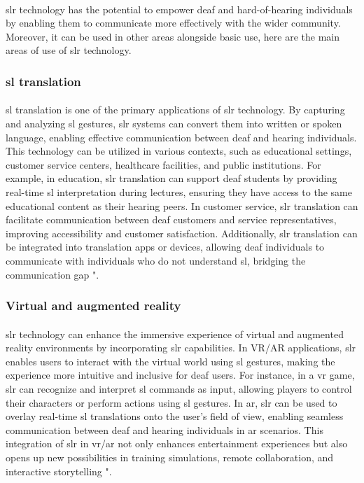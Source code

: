 \paragraph{}
\ac{slr} technology has the potential to empower deaf and hard-of-hearing individuals by enabling them to communicate more effectively with the wider community. Moreover, it can be used in other areas alongside basic use, here are the main areas of use of \ac{slr} technology.
\subsubsection{\ac{sl} translation}
\paragraph{}
\ac{sl} translation is one of the primary applications of \ac{slr} technology. By capturing and analyzing \ac{sl} gestures, \ac{slr} systems can convert them into written or spoken language, enabling effective communication between deaf and hearing individuals. This technology can be utilized in various contexts, such as educational settings, customer service centers, healthcare facilities, and public institutions. For example, in education, \ac{slr} translation can support deaf students by providing real-time \ac{sl} interpretation during lectures, ensuring they have access to the same educational content as their hearing peers. In customer service, \ac{slr} translation can facilitate communication between deaf customers and service representatives, improving accessibility and customer satisfaction. Additionally, \ac{slr} translation can be integrated into translation apps or devices, allowing deaf individuals to communicate with individuals who do not understand \ac{sl}, bridging the communication gap "\cite{stewart1998sign}.
\subsubsection{Virtual and augmented reality}
\paragraph{}
\ac{slr} technology can enhance the immersive experience of virtual and augmented reality environments by incorporating \ac{slr} capabilities. In VR/AR applications, \ac{slr} enables users to interact with the virtual world using \ac{sl} gestures, making the experience more intuitive and inclusive for deaf users. For instance, in a \ac{vr} game, \ac{slr} can recognize and interpret \ac{sl} commands as input, allowing players to control their characters or perform actions using \ac{sl} gestures. In \ac{ar}, \ac{slr} can be used to overlay real-time \ac{sl} translations onto the user's field of view, enabling seamless communication between deaf and hearing individuals in \ac{ar} scenarios. This integration of \ac{slr} in \ac{vr}/\ac{ar} not only enhances entertainment experiences but also opens up new possibilities in training simulations, remote collaboration, and interactive storytelling "\cite{huang2018attention}.
